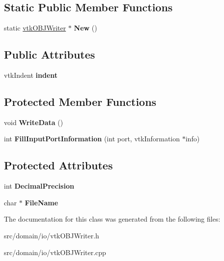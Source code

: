 \subsection*{Static Public Member Functions}
\begin{DoxyCompactItemize}
\item 
\hypertarget{classvtk_o_b_j_writer_a0ec18bdb00e8840834386c832da4a993}{}static \hyperlink{classvtk_o_b_j_writer}{vtk\+O\+B\+J\+Writer} $\ast$ {\bfseries New} ()\label{classvtk_o_b_j_writer_a0ec18bdb00e8840834386c832da4a993}

\end{DoxyCompactItemize}
\subsection*{Public Attributes}
\begin{DoxyCompactItemize}
\item 
\hypertarget{classvtk_o_b_j_writer_aedc7487816fbc7de4f829b3b34ac0e71}{}vtk\+Indent {\bfseries indent}\label{classvtk_o_b_j_writer_aedc7487816fbc7de4f829b3b34ac0e71}

\end{DoxyCompactItemize}
\subsection*{Protected Member Functions}
\begin{DoxyCompactItemize}
\item 
\hypertarget{classvtk_o_b_j_writer_a2ccd62fd10f3399cdce8e902b523c00d}{}void {\bfseries Write\+Data} ()\label{classvtk_o_b_j_writer_a2ccd62fd10f3399cdce8e902b523c00d}

\item 
\hypertarget{classvtk_o_b_j_writer_ad5378fddacada75bb874063d9c4e943b}{}int {\bfseries Fill\+Input\+Port\+Information} (int port, vtk\+Information $\ast$info)\label{classvtk_o_b_j_writer_ad5378fddacada75bb874063d9c4e943b}

\end{DoxyCompactItemize}
\subsection*{Protected Attributes}
\begin{DoxyCompactItemize}
\item 
\hypertarget{classvtk_o_b_j_writer_a6fa7e526c00cd63fe95616f3497108ef}{}int {\bfseries Decimal\+Precision}\label{classvtk_o_b_j_writer_a6fa7e526c00cd63fe95616f3497108ef}

\item 
\hypertarget{classvtk_o_b_j_writer_a619a6a48107c8af0dedba93d2d7fa937}{}char $\ast$ {\bfseries File\+Name}\label{classvtk_o_b_j_writer_a619a6a48107c8af0dedba93d2d7fa937}

\end{DoxyCompactItemize}


The documentation for this class was generated from the following files\+:\begin{DoxyCompactItemize}
\item 
src/domain/io/vtk\+O\+B\+J\+Writer.\+h\item 
src/domain/io/vtk\+O\+B\+J\+Writer.\+cpp\end{DoxyCompactItemize}
